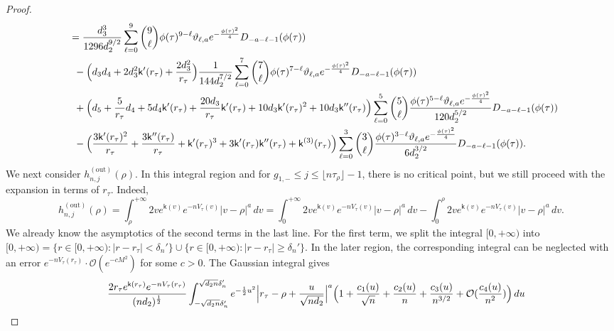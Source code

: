 \documentclass[reqno]{amsart}
\newcommand{\1}{\mathds{1}}
\numberwithin{equation}{section}
\theoremstyle{definition}
\begin{document}
\begin{proof}
\begin{align}
\begin{split}
&\,\,\,=
\frac{d_3^3}{1296d_2^{9/2}}
\sum_{\ell=0}^{9}\binom{9}{\ell}\phi(\tau)^{9-\ell}
\vartheta_{\ell,a}e^{-\frac{\phi(\tau)^2}{4}}D_{-a-\ell-1}(\phi(\tau))
\\
&\quad
-\Bigl(d_3d_4+2d_3^2\mathsf{k}'(r_{\tau})+\frac{2d_3^2}{r_{\tau}} \Bigr)\frac{1}{144d_2^{7/2}}
\sum_{\ell=0}^{7}\binom{7}{\ell}\phi(\tau)^{7-\ell}
\vartheta_{\ell,a}e^{-\frac{\phi(\tau)^2}{4}}D_{-a-\ell-1}(\phi(\tau))
\\
&\quad
+
\Bigl(
d_5+\frac{5}{r_{\tau}}d_4+5d_4\mathsf{k}'(r_{\tau})+\frac{20d_3}{r_{\tau}}\mathsf{k}'(r_{\tau})+10d_3\mathsf{k}'(r_{\tau})^2+10d_3\mathsf{k}''(r_{\tau})
\Bigr)
\sum_{\ell=0}^{5}\binom{5}{\ell}
\frac{\phi(\tau)^{5-\ell}\vartheta_{\ell,a}e^{-\frac{\phi(\tau)^2}{4}}}{120d_2^{5/2}}D_{-a-\ell-1}(\phi(\tau))
\\
&\quad
-
\Bigl(\frac{3\mathsf{k}'(r_{\tau})^2}{r_{\tau}}
+\frac{3\mathsf{k}''(r_{\tau})}{r_{\tau}}+\mathsf{k}'(r_{\tau})^3+3\mathsf{k}'(r_{\tau})\mathsf{k}''(r_{\tau})+\mathsf{k}^{(3)}(r_{\tau})\Bigr)
\sum_{\ell=0}^{3}\binom{3}{\ell}
\frac{\phi(\tau)^{3-\ell}
\vartheta_{\ell,a}e^{-\frac{\phi(\tau)^2}{4}}}{6d_2^{3/2}}D_{-a-\ell-1}(\phi(\tau)).
\end{split}
\end{align}
We next consider $h_{n,j}^{(\mathrm{out})}(\rho)$. 
In this integral region and for $g_{1,-}\leq j\leq \lfloor n\tau_{\rho} \rfloor -1$, there is no critical point, but we still proceed with the expansion in terms of $r_{\tau}$. Indeed, 
\[
h_{n,j}^{(\mathrm{out})}(\rho)=\int_{\rho}^{+\infty} 2ve^{\mathsf{k}(v)}e^{-nV_{\tau}(v)}|v-\rho|^{a}\,dv =
\int_{0}^{+\infty} 2ve^{\mathsf{k}(v)}e^{-nV_{\tau}(v)}|v-\rho|^{a}\,dv
-
\int_0^{\rho}2ve^{\mathsf{k}(v)}e^{-nV_{\tau}(v)}|v-\rho|^{a}\,dv.
\]
We already know the asymptotics of the second terms in the last line. 
For the first term, we split the integral $[0,+\infty)$ into $[0,+\infty)=\{r\in[0,+\infty): |r-r_{\tau}|<\delta_n'\}\cup\{r\in[0,+\infty): |r-r_{\tau}|\geq\delta_n'\}$. 
In the later region, the corresponding integral can be neglected with an error $e^{-nV_{\tau}(r_{\tau})}\cdot \mathcal{O}(e^{-cM^2})$ for some $c>0$. 
The Gaussian integral gives 
\begin{align*}
&\quad 
\frac{2r_{\tau}e^{\mathsf{k}(r_{\tau})}e^{-nV_{\tau}(r_{\tau})}}{(nd_2)^{\frac{1}{2}}}
\int_{-\sqrt{d_2n}\delta_n'}^{\sqrt{d_2n}\delta_n'}
e^{-\frac{1}{2}u^2}
\Bigl|r_{\tau}-\rho+\frac{u}{\sqrt{nd_2}}\Bigr|^{a}
\Bigl( 
1+\frac{c_1(u)}{\sqrt{n}}+\frac{c_2(u)}{n}+\frac{c_3(u)}{n^{3/2}}+\mathcal{O}(\frac{c_4(u)}{n^2})
\Bigr)\,du
\\

\end{align*}
\end{proof}
\end{document}
